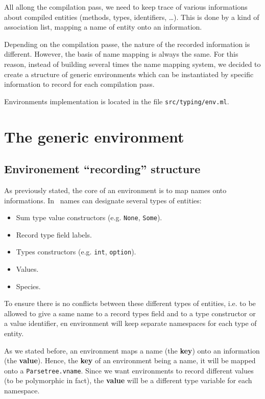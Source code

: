 
All allong the compilation pass, we need to keep trace of various
informations about compiled entities (methods, types, identifiers,
\ldots). This is done by a kind of association list, mapping a name of
entity onto an information.

Depending on the compilation passe, the nature of the recorded
information is different. However, the basis of name mapping is always
the same. For this reason, instead of building several times the name
mapping system, we decided to create a structure of generic
environments which can be instantiated by specific information to
record for each compilation pass.

Environments implementation is located in the file
{\tt src/typing/env.ml}.


\section{The generic environment}

\subsection{Environement ``recording'' structure}
As previously stated, the core of an environment is to map names onto
informations. In \focalize\, names can designate several types of
entities:
\begin{itemize}
  \item Sum type value constructors (e.g. {\tt None}, {\tt Some}).
  \item Record type field labels.
  \item Types constructors (e.g. {\tt int}, {\tt option}).
  \item Values.
  \item Species.
\end{itemize}

To ensure there is no conflicts between these different types of
entities, i.e. to be allowed to give a same name to a record types
field and to a type constructor or a value identifier, en environment
will keep separate namespaces for each type of entity.

As we stated before, an environment maps a name (the {\bf key}) onto
an information (the {\bf value}). Hence, the {\bf key} of an
environment being a name, it will be mapped onto a
{\tt Parsetree.vname}. Since we want environments to record different
values (to be polymorphic in fact), the {\bf value} will be a
different type variable for each namespace.

